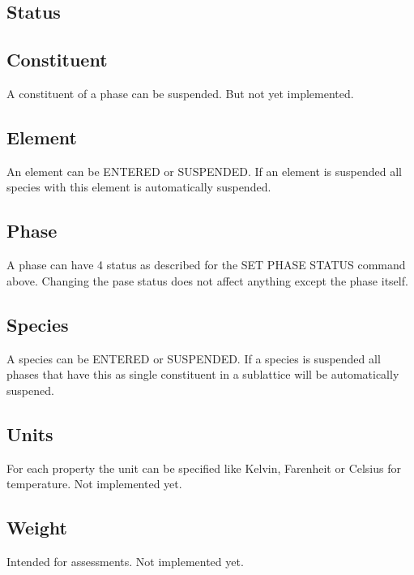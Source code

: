 \documentclass[12pt]{article}
\begin{document}
\subsection{Status}

\subsection{Constituent}

A constituent of a phase can be suspended.  But not yet implemented.

\subsection{Element}

An element can be ENTERED or SUSPENDED.  If an element is suspended
all species with this element is automatically suspended.

\subsection{Phase}

A phase can have 4 status as described for the SET PHASE STATUS
command above.  Changing the pase status does not affect anything
except the phase itself.

\subsection{Species}

A species can be ENTERED or SUSPENDED.  If a species is suspended
all phases that have this as single constituent in a sublattice
will be automatically suspened.

\subsection{Units}

For each property the unit can be specified like Kelvin, Farenheit or
Celsius for temperature.  Not implemented yet.

\subsection{Weight}

Intended for assessments.  Not implemented yet.
\end{document}
